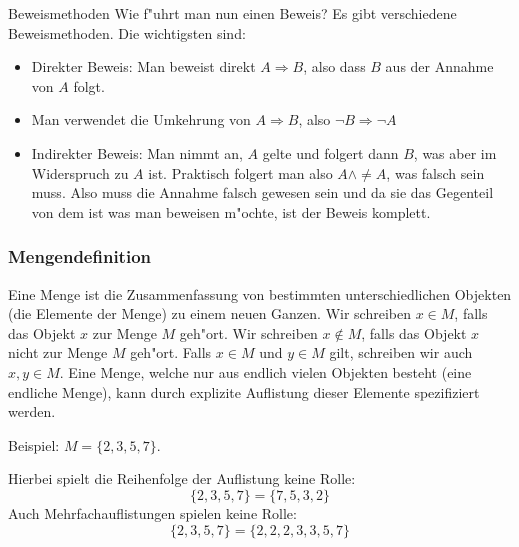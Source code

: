 \documentclass{beamer}
\begin{document}
\begin{frame}{Beweismethoden}
  Wie f"uhrt man nun einen Beweis? Es gibt verschiedene Beweismethoden. Die wichtigsten sind:
  \begin{itemize}
    \item Direkter Beweis: Man beweist direkt $A\Rightarrow B$, also dass $B$ aus der Annahme von $A$ folgt.
    \item Man verwendet die Umkehrung von $A\Rightarrow B$, also $\neg B\Rightarrow\neg A$
    \item Indirekter Beweis: Man nimmt an, $A$ gelte und folgert dann $B$, was aber im Widerspruch zu $A$ ist. Praktisch folgert man also $A\wedge\neq A$, was falsch sein muss. Also muss die Annahme falsch gewesen sein und da sie das Gegenteil von dem ist was man beweisen m"ochte, ist der Beweis komplett.
  \end{itemize}
  
\end{frame}
\begin{frame}
  \frametitle{Mengendefinition}
  \begin{definition}
    Eine Menge ist die Zusammenfassung von bestimmten unterschiedlichen
    Objekten (die Elemente der Menge) zu einem neuen Ganzen.
    Wir schreiben $x\in M$, falls das Objekt $x$ zur Menge $M$ geh"ort.
    Wir schreiben $x\notin M$, falls das Objekt $x$ nicht zur Menge $M$ geh"ort.
    Falls $x\in M$ und $y\in M$ gilt, schreiben wir auch $x, y \in M$.
    Eine Menge, welche nur aus endlich vielen Objekten besteht (eine endliche
    Menge), kann durch explizite Auflistung dieser Elemente spezifiziert
    werden.
  \end{definition}
    Beispiel: $M=\{2,3,5,7\}$.

    Hierbei spielt die Reihenfolge der Auflistung keine Rolle:
    \[\{2,3,5,7\}=\{7,5,3,2\}\]
    Auch Mehrfachauflistungen spielen keine Rolle:
    \[\{2,3,5,7\}=\{2,2,2,3,3,5,7\}\]
  \end{frame}
\end{document}
